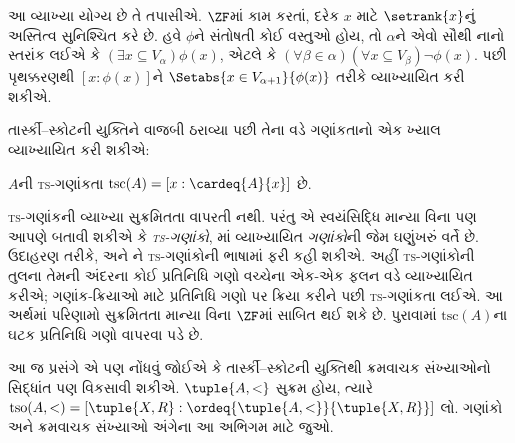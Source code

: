 આ વ્યાખ્યા યોગ્ય છે તે તપાસીએ. $\ZF$માં
કામ કરતાં,
દરેક $x$ માટે $\setrank{x}$નું અસ્તિત્વ
સુનિશ્ચિત કરે છે. હવે $\phi$ને સંતોષતી
કોઈ વસ્તુઓ હોય, તો $\alpha$ને એવો સૌથી
નાનો સ્તરાંક લઈએ કે
$(\exists x\subseteq V_\alpha)\phi(x)$,
એટલે કે $(\forall \beta \in \alpha)(\forall x
\subseteq V_\beta)\lnot \phi(x)$.
પછી પૃથક્કરણથી $[x : \phi(x)]$ને
$\Setabs{x \in V_{\alpha+1}}{\phi(x)}$
તરીકે વ્યાખ્યાયિત કરી શકીએ.

તાર્સ્કી--સ્કોટની યુક્તિને વાજબી ઠરાવ્યા
પછી તેના વડે ગણાંકતાનો એક ખ્યાલ
વ્યાખ્યાયિત કરી શકીએ:

\begin{defn}
$A$ની \textsc{ts}-ગણાંકતા
$\text{tsc}(A) = [x : \cardeq{A}{x}]$ છે.
\end{defn}

\textsc{ts}-ગણાંકની વ્યાખ્યા સુક્રમિતતા
વાપરતી નથી. પરંતુ એ સ્વયંસિદ્ધિ માન્યા
વિના પણ આપણે બતાવી શકીએ કે
\emph{\textsc{ts}-ગણાંકો},
માં
વ્યાખ્યાયિત \emph{ગણાંકો}ની જેમ ઘણુંખરું
વર્તે છે. ઉદાહરણ તરીકે,
અને ને
\textsc{ts}-ગણાંકોની ભાષામાં ફરી કહી શકીએ. અહીં
\textsc{ts}-ગણાંકોની તુલના તેમની અંદરના કોઈ પ્રતિનિધિ ગણો
વચ્ચેના એક-એક ફલન વડે વ્યાખ્યાયિત કરીએ; ગણાંક-ક્રિયાઓ માટે
પ્રતિનિધિ ગણો પર ક્રિયા કરીને પછી \textsc{ts}-ગણાંકતા લઈએ.
આ અર્થમાં પરિણામો સુક્રમિતતા માન્યા વિના $\ZF$માં સાબિત થઈ શકે છે.
પુરાવામાં $\text{tsc}(A)$ના ઘટક પ્રતિનિધિ ગણો વાપરવા પડે છે.

આ જ પ્રસંગે એ પણ નોંધવું જોઈએ કે
તાર્સ્કી--સ્કોટની યુક્તિથી ક્રમવાચક
સંખ્યાઓનો સિદ્ધાંત પણ વિકસાવી શકીએ.
$\tuple{A, <}$ સુક્રમ હોય, ત્યારે
$\text{tso}(A, <) = [\tuple{X,
R} : \ordeq{\tuple{A, <}}{\tuple{X, R}}]$ લો.
ગણાંકો અને ક્રમવાચક સંખ્યાઓ અંગેના આ
અભિગમ માટે \citet[chs.~9--12]{Potter2004} જુઓ.
\endgroup

\begingroup
\makeatletter{}\makeatother

\label{guunit:OLP-0595}



